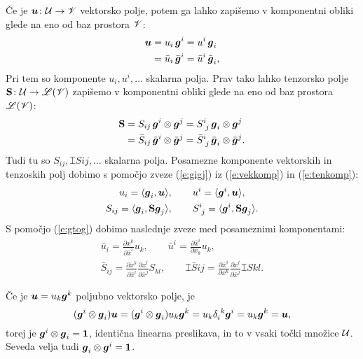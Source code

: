Če je $\boldsymbol u\colon \mathcal U\to\mathscr V$ vektorsko polje, potem ga lahko zapišemo v komponentni
obliki glede na eno od baz prostora $\mathscr V$:
\begin{align}
	\boldsymbol u&=u_i\,\boldsymbol g^i=u^i\,\boldsymbol g_i \nonumber \\
	&=\bar{u}_i\,\bar{\boldsymbol g}^i=\bar{u}^i\,\bar{\boldsymbol g}_i, \label{e:vekkomp}
\end{align}
Pri tem so komponente $u_i,u^i,\dots$ skalarna polja.
Prav tako lahko tenzorsko polje $\mathbf S\colon \mathcal U\to\mathscr L(\mathscr V)$ zapišemo v
komponentni obliki glede na eno od baz prostora $\mathscr L(\mathscr V)$:
\begin{align}
	\ten{S}&=S_{ij}\,\vek{g}^i\otimes\vek{g}^j=\topbot{S}{i}{j}\,\vek{g}_i\otimes\vek{g}^j \nonumber \\
	&=\bar{S}_{ij}\,\bar{\vek{g}}^i\otimes\bar{\vek{g}}^j=
	\topbot{\bar{S}}{i}{j}\,\bar{\vek{g}}_i\otimes\bar{\vek{g}}^j. \label{e:tenkomp}
\end{align}
Tudi tu so $S_{ij},\topbot{S}{i}{j},\dots$ skalarna polja.
Posamezne komponente vektorskih in tenzoskih polj dobimo s pomočjo zveze (\ref{e:gigj})
iz (\ref{e:vekkomp}) in (\ref{e:tenkomp}):
\begin{gather}
	u_i=\langle\vek{g}_i,\vek{u}\rangle,\qquad u^i=\langle\vek{g}^i,\vek{u}\rangle, \label{e:kompvek} \\
	S_{ij}=\langle\vek{g}_i,\ten{S}\vek{g}_j\rangle,\qquad\topbot{S}{i}{j}=\langle\vek{g}^i,\ten{S}\vek{g}_j\rangle.\label{e:kompten}
\end{gather}
S pomočjo (\ref{e:gtog}) dobimo naslednje zveze med posameznimi komponentami:
\begin{gather*}
	\bar{u}_i=\frac{\partial x^k}{\partial\bar{x}^i}u_k, \qquad
	\bar{u}^i=\frac{\partial\bar{x}^i}{\partial x_k}u_k, \\
	\bar{S}_{ij}=\frac{\partial x^k}{\partial\bar{x}^i}\frac{\partial x^l}{\partial\bar{x}^j}S_{kl}, \qquad
	\topbot{\bar{S}}{i}{j}=\frac{\partial\bar{x}^i}{\partial x^k}\frac{\partial x^l}{\partial\bar{x}^j}\topbot{S}{k}{l}.
\end{gather*}

Če je $\boldsymbol u=u_k\boldsymbol g^k$ poljubno vektorsko polje, je
\begin{equation*} %
	(\vek{g}^i\otimes\vek{g}_i)\vek{u}=(\vek{g}^i\otimes\vek{g}_i)u_k\vek{g}^k=
	u_k\bottop{\delta}{i}{k}\vek{g}^i=u_k\vek{g}^k=\vek{u},
\end{equation*}
torej je $\boldsymbol g^i\otimes\boldsymbol g_i=\mathbf 1$, identična linearna preslikava, in to
v vsaki točki množice $\mathcal U$. Seveda velja tudi $\boldsymbol g_i\otimes\boldsymbol g^i=\mathbf 1$.


